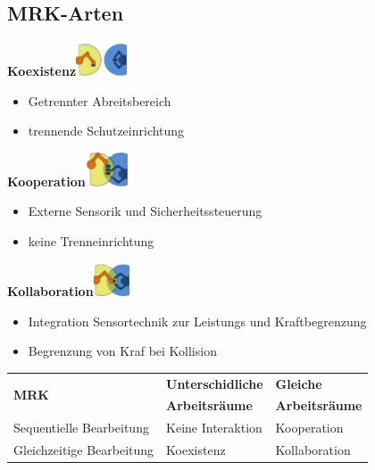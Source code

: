 \subsection{MRK-Arten}
\begin{minipage}[t]{\linewidth}
\begin{minipage}[t]{0.33\linewidth}
\textbf{Koexistenz}\hfill\includegraphics[height=1cm]{./bilder/MRKarten1}
    \begin{itemize}
         \item Getrennter Abreitsbereich
         \item trennende Schutzeinrichtung
    \end{itemize}
\end{minipage}
\begin{minipage}[t]{0.33\linewidth}
    \textbf{Kooperation}\hfill\includegraphics[height=1cm]{./bilder/MRKarten2}
    \begin{itemize}
        \item Externe Sensorik und Sicherheitssteuerung
        \item keine Trenneinrichtung
    \end{itemize}
\end{minipage}
\begin{minipage}[t]{0.33\linewidth}
    \textbf{Kollaboration}\hfill\includegraphics[height=1cm]{./bilder/MRKarten3}
    \begin{itemize}
        \item Integration Sensortechnik zur Leistungs und Kraftbegrenzung
        \item Begrenzung von Kraf bei Kollision
    \end{itemize}
\end{minipage}
\end{minipage}
\begin{tabular}{lll}
    \multirow{2}{3cm}{\textbf{MRK}}&\textbf{Unterschidliche}&\textbf{Gleiche}\\
                &\textbf{Arbeitsräume}&\textbf{Arbeitsräume}\\ \hline
    Sequentielle Bearbeitung& Keine Interaktion& Kooperation\\
    Gleichzeitige Bearbeitung & Koexistenz& Kollaboration\\
\end{tabular}

